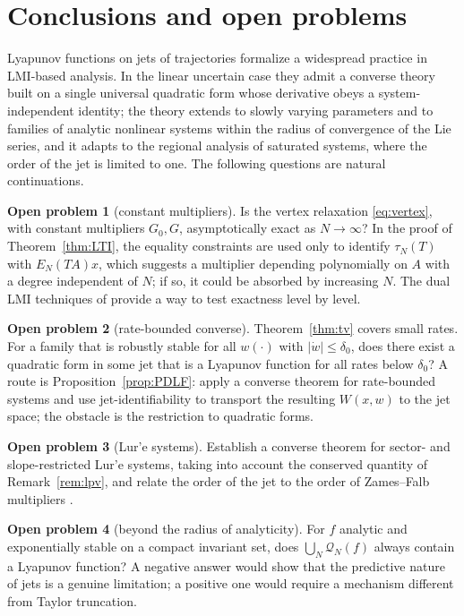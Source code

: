 \documentclass[preprint,12pt,authoryear]{elsarticle}
\theoremstyle{definition}
\newtheorem{problem}{Open problem}
\theoremstyle{remark}
\begin{document}
\section{Conclusions and open problems}\label{sec:conc}

Lyapunov functions on jets of trajectories formalize a widespread practice in LMI-based analysis. In the linear uncertain case they admit a converse theory built on a single universal quadratic form whose derivative obeys a system-independent identity; the theory extends to slowly varying parameters and to families of analytic nonlinear systems within the radius of convergence of the Lie series, and it adapts to the regional analysis of saturated systems, where the order of the jet is limited to one. The following questions are natural continuations.

\begin{problem}[constant multipliers]\label{pb:constG}
Is the vertex relaxation \eqref{eq:vertex}, with constant multipliers $G_0,G$, asymptotically exact as $N\to\infty$? In the proof of Theorem~\ref{thm:LTI}, the equality constraints are used only to identify $\tau_N(T)$ with $E_N(TA)x$, which suggests a multiplier depending polynomially on $A$ with a degree independent of $N$; if so, it could be absorbed by increasing $N$. The dual LMI techniques of \citet{Scherer2005,EbiharaBook2015} provide a way to test exactness level by level.
\end{problem}

\begin{problem}[rate-bounded converse]
Theorem~\ref{thm:tv} covers small rates. For a family that is robustly stable for all $w(\cdot)$ with $|\dot w|\le\delta_0$, does there exist a quadratic form in some jet that is a Lyapunov function for all rates below $\delta_0$? A route is Proposition~\ref{prop:PDLF}: apply a converse theorem for rate-bounded systems and use jet-identifiability to transport the resulting $W(x,w)$ to the jet space; the obstacle is the restriction to quadratic forms.
\end{problem}

\begin{problem}[Lur'e systems]
Establish a converse theorem for sector- and slope-restricted Lur'e systems, taking into account the conserved quantity of Remark~\ref{rem:lpv}, and relate the order of the jet to the order of Zames--Falb multipliers \citep{Carrasco2016}.
\end{problem}

\begin{problem}[beyond the radius of analyticity]\label{pb:NL}
For $f$ analytic and exponentially stable on a compact invariant set, does $\bigcup_N\mathcal Q_N(f)$ always contain a Lyapunov function? A negative answer would show that the predictive nature of jets is a genuine limitation; a positive one would require a mechanism different from Taylor truncation.
\end{problem}
\end{document}

